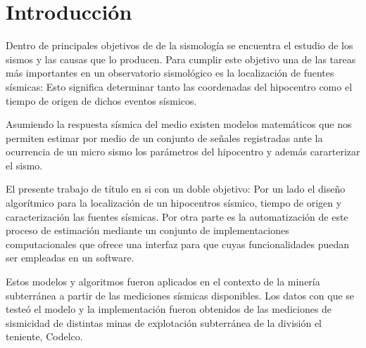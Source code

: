 \chapter*{Introducción} 

Dentro de principales objetivos de de la sismología se encuentra el estudio
de los sismos y las causas que lo producen. Para cumplir este objetivo una de las
tareas más importantes en un observatorio sismológico es la localización de
fuentes sísmicas: Esto significa determinar tanto las coordenadas del hipocentro
como el tiempo de origen de dichos eventos sísmicos.

Asumiendo la respuesta sísmica del medio existen modelos matemáticos que nos
permiten estimar por medio de un conjunto de señales registradas ante la
ocurrencia de un micro sismo los parámetros del hipocentro y además cararterizar el sismo.  %

El presente trabajo de título en si con un doble objetivo: Por un lado el diseño
algorítmico para la localización de un hipocentros sísmico, tiempo de origen y
caracterización las fuentes sísmicas. Por otra parte es la automatización de
este proceso de estimación mediante un conjunto de implementaciones
computacionales que ofrece una interfaz para que cuyas funcionalidades puedan
ser empleadas en un software.

Estos modelos y algoritmos fueron aplicados en el contexto de la minería
subterránea a partir de las mediciones sísmicas disponibles. Los datos con que
se testeó el modelo y la implementación fueron obtenidos de las mediciones de
sismicidad de distintas minas de explotación subterránea de la división el
teniente, Codelco.

